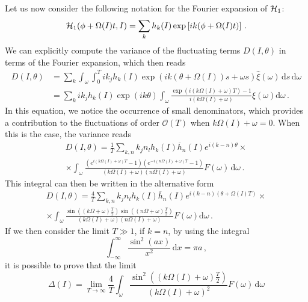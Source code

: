 Let us now consider the following notation for the Fourier expansion of $\mathcal{H}_1$:
\begin{equation}
    \mathcal{H}_1(\phi + \Omega(I)t, I) = \sum_k h_k(I)\exp\left[ik(\phi+\Omega(I)t)\right]\,.
\end{equation}
We can explicitly compute the variance of the fluctuating terms $D(I,\theta)$ in terms of the Fourier expansion, which then reads
\begin{equation}
    \begin{aligned}
    D(I,\theta) &= \sum_k \int_\omega \int_0^T ik_j h_k(I) \exp(ik(\theta+\Omega(I))s+\omega s)\hat \xi(\omega)\,\mathrm{d}s\, \mathrm{d}\omega \\
    &= \sum_k i k_j h_k(I) \exp(ik\theta)\int_\omega\frac{\exp(i(k\Omega(I)+\omega )T)-1}{i(k\Omega(I)+\omega)}\hat \xi(\omega) \mathrm{d}\omega \,.
    \end{aligned}
\end{equation}
In this equation, we notice the occurrence of small denominators, which provides a contribution to the fluctuations of order $\mathcal{O}(T)$ when $k\Omega(I) + \omega = 0$. When this is the case, the variance reads
\begin{multline}
    D(I,\theta) = \frac{1}{T}\sum_{k,n} k_j n_l h_k(I) \overline{h}_n(I) e^{i(k-n)\theta}\times
    \\ \times\int_\omega\frac{\left(e^{i(k\Omega(I)+\omega )T}-1\right)\left(e^{-i(n\Omega(I)+\omega )T}-1\right)}{(k\Omega(I)+\omega)(n\Omega(I)+\omega)}F(\omega)\,\mathrm{d}\omega \,.
\end{multline}
This integral can then be written in the alternative form
\begin{multline}
    D(I,\theta)=\frac{4}{T}\sum_{k,n} k_j n_l h_k(I) \overline{h}_n(I) e^{i(k-n)(\theta+\Omega(I)T)}\times\\
    \times\int_\omega\frac{\sin\left((k\Omega+\omega)\frac{T}{2}\right)\sin\left((n\Omega+\omega)\frac{T}{2}\right)}{(k\Omega(I)+\omega)(n\Omega(I)+\omega)}F(\omega) \mathrm{d}\omega\,.
    \label{eq:the_big_integral}
\end{multline}
If we then consider the limit $T\gg 1$, if $k=n$, by using the integral
\begin{equation}
    \int_{-\infty}^\infty \frac{\sin^2(ax)}{x^2}\,\mathrm{d}x=\pi a\,,
\end{equation}
it is possible to prove that the limit
\begin{equation}
    \Delta(I)=\lim_{T\to\infty}\frac{4}{T} \int_\omega\frac{\sin^2\left((k\Omega(I)+\omega)\frac{T}{2}\right)}{(k\Omega(I)+\omega)^2}F(\omega)\,\mathrm{d}\omega
\end{equation}

